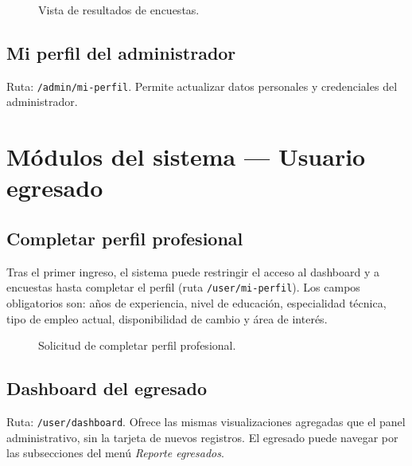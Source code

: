 \begin{figure}[H]
\centering
{}
\caption{Vista de resultados de encuestas.}
\label{fig:resultados-encuesta}
\end{figure}

\subsection{Mi perfil del administrador}

Ruta: \texttt{/admin/mi-perfil}. Permite actualizar datos personales y credenciales del administrador.

\section{Módulos del sistema --- Usuario egresado}
\label{sec:manual-egresado}

\subsection{Completar perfil profesional}
\label{subsec:perfil-egresado}

Tras el primer ingreso, el sistema puede restringir el acceso al dashboard y a encuestas hasta completar el perfil (ruta \texttt{/user/mi-perfil}). Los campos obligatorios son: años de experiencia, nivel de educación, especialidad técnica, tipo de empleo actual, disponibilidad de cambio y área de interés.

\begin{figure}[H]
\centering
{}
\caption{Solicitud de completar perfil profesional.}
\label{fig:perfil-incompleto}
\end{figure}

\subsection{Dashboard del egresado}

Ruta: \texttt{/user/dashboard}. Ofrece las mismas visualizaciones agregadas que el panel administrativo, sin la tarjeta de nuevos registros. El egresado puede navegar por las subsecciones del menú \emph{Reporte egresados}.

